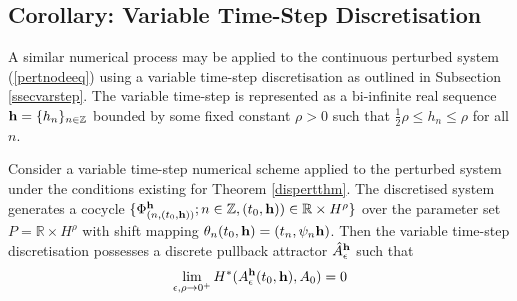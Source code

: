 \subsection{Corollary: Variable Time-Step Discretisation}

A similar numerical process may be applied to the continuous perturbed
system (\ref{pertnodeeq}) using a variable time-step discretisation as outlined
in Subsection \ref{ssecvarstep}. The variable time-step is represented as a
bi-infinite real sequence ${\bf h} = \{ h_n \}_{n \in \mathbb{Z}}$ bounded by
some fixed constant $\rho > 0$ such that $\frac{1}{2} \rho \leq h_n \leq \rho$
for all $n$.

\begin{cor}\label{corvardispert}
Consider a variable time-step numerical scheme applied to the perturbed
system under the conditions existing for Theorem \ref{dispertthm}. The
discretised system generates a cocycle $\{ \Phi^{{\bf h}}_{(n,(t_0,{\bf h}))}; n
\in \mathbb{Z}, (t_0,{\bf h})) \in \mathbb{R} \times H^{\rho} \}$ over the
parameter set $P = \mathbb{R} \times H^{\rho}$ with shift mapping $\theta_n
(t_0, {\bf h}) = (t_n, \psi_n {\bf h})$.
Then the variable time-step discretisation possesses a discrete pullback
attractor $\hat{A}^{\bf h}_{\epsilon}$ such that
\[ \lim_{\epsilon, \rho \rightarrow 0^{+}}
        H^{*}(A^{{\bf h}}_{\epsilon}(t_0, {\bf h}),A_0)=0 \]
\end{cor}
